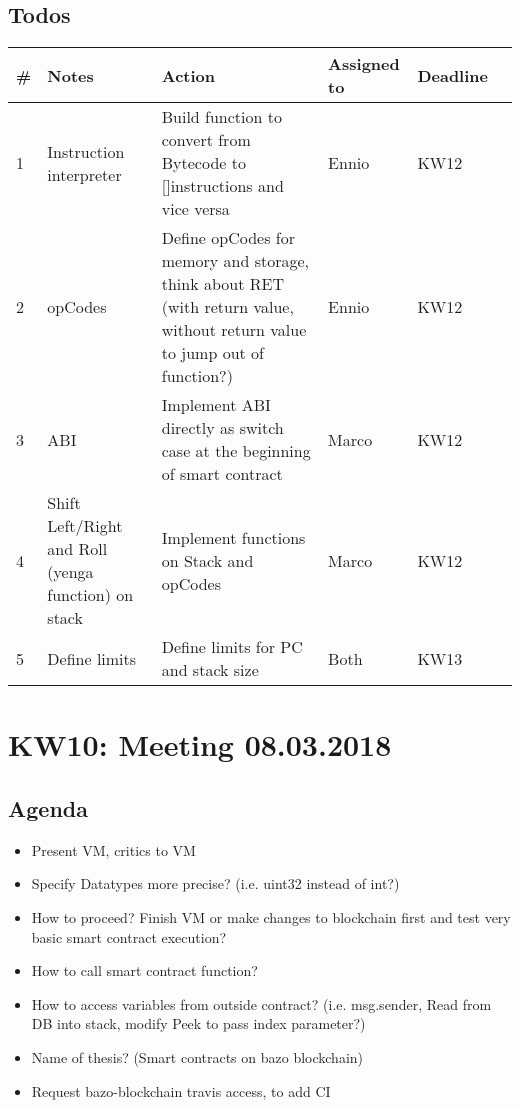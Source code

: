 \subsection{Todos}
\begin{table}[H]
\centering
\begin{tabular}{L{1cm} L{3cm} L{6cm} L{1.5cm} R{1.5cm} R{1cm}}
\toprule
\# & Notes                                               & Action                                                                                                                    & Assigned to & Deadline \\   & Instruction interpreter                             & Build function to convert from Bytecode to {[}{]}instructions and vice versa                                              & Ennio       & KW12     \\
2  & opCodes                                             & Define opCodes for memory and storage, think about RET (with return value, without return value to jump out of function?) & Ennio       & KW12     \\
3  & ABI                                                 & Implement ABI directly as switch case at the beginning of smart contract                                                  & Marco       & KW12     \\
4  & Shift Left/Right and Roll (yenga function) on stack & Implement functions on Stack and opCodes                                                                                  & Marco       & KW12     \\
5  & Define limits                                       & Define limits for PC and stack size                                                                                       & Both        & KW13     \\ \bottomrule
\end{tabular}
\end{table}

\section{KW10: Meeting 08.03.2018}
\subsection{Agenda}
\begin{itemize}
\item
  Present VM, critics to VM
\item
  Specify Datatypes more precise? (i.e. uint32 instead of int?)
\item
  How to proceed? Finish VM or make changes to blockchain first and test
  very basic smart contract execution?
\item
  How to call smart contract function?
\item
  How to access variables from outside contract? (i.e. msg.sender, Read
  from DB into stack, modify Peek to pass index parameter?)
\item
  Name of thesis? (Smart contracts on bazo blockchain)
\item
  Request bazo-blockchain travis access, to add CI
\end{itemize}

